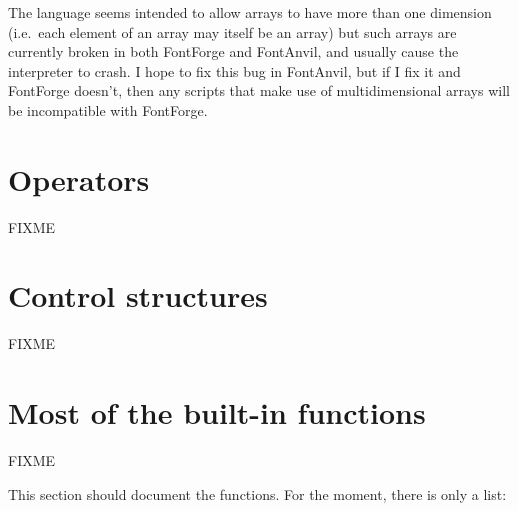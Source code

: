 \documentclass[11pt]{report}
\begin{document}
\begin{framed}
The language seems intended to allow arrays to have more than one dimension
(i.e.\ each element of an array may itself be an array) but such arrays are
currently broken in both FontForge and FontAnvil, and usually cause the
interpreter to crash.  I hope to fix this bug in FontAnvil, but if I fix it
and FontForge doesn't, then any scripts that make use of multidimensional
arrays will be incompatible with FontForge.
\end{framed}

\section{Operators}

FIXME

\section{Control structures}

FIXME

\section{Most of the built-in functions}

FIXME

This section should document the functions.  For the moment, there is
only a list:
\end{document}
